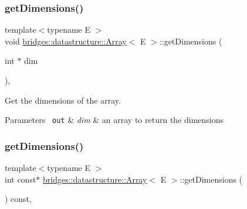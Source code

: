 \subsubsection{\texorpdfstring{getDimensions()}{getDimensions()}\hspace{0.1cm}{\footnotesize\ttfamily [1/2]}}
{\footnotesize\ttfamily template$<$typename E $>$ \\
void \mbox{\hyperlink{classbridges_1_1datastructure_1_1_array}{bridges\+::datastructure\+::\+Array}}$<$ E $>$\+::get\+Dimensions (\begin{DoxyParamCaption}\item[{int $\ast$}]{dim }\end{DoxyParamCaption})\hspace{0.3cm}{\ttfamily [inline]}, {\ttfamily [protected]}}



Get the dimensions of the array. 


\begin{DoxyParams}[1]{Parameters}
\mbox{\texttt{ out}}  & {\em dim} & an array to return the dimensions \\
\hline
\end{DoxyParams}
\mbox{\label{classbridges_1_1datastructure_1_1_array_a6d9edc546fa172a47f19de3c2ea93ebf}} 
\subsubsection{\texorpdfstring{getDimensions()}{getDimensions()}\hspace{0.1cm}{\footnotesize\ttfamily [2/2]}}
{\footnotesize\ttfamily template$<$typename E $>$ \\
int const$\ast$ \mbox{\hyperlink{classbridges_1_1datastructure_1_1_array}{bridges\+::datastructure\+::\+Array}}$<$ E $>$\+::get\+Dimensions (\begin{DoxyParamCaption}{ }\end{DoxyParamCaption}) const\hspace{0.3cm}{\ttfamily [inline]}, {\ttfamily [protected]}}

\mbox{\label{classbridges_1_1datastructure_1_1_array_a3b6d694fe5d336a0a15951d522852e51}} 
